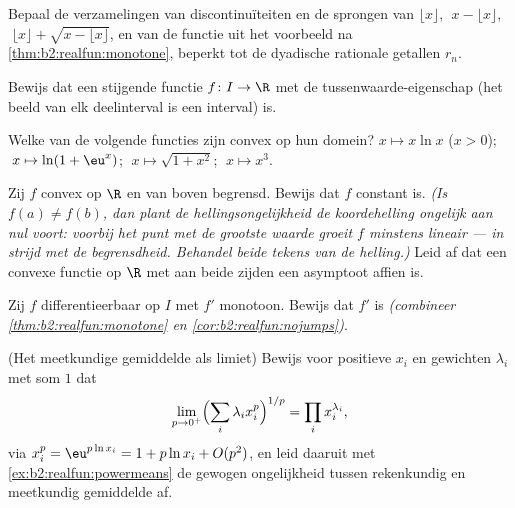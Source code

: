 \begin{exercise}[$\star$]\label{exo:b2:realfun:1}
Bepaal de verzamelingen van discontinuïteiten en de sprongen van
$\lfloor x \rfloor$, $\;x - \lfloor x\rfloor$, $\;\lfloor x \rfloor
+ \sqrt{x - \lfloor x\rfloor}$, en van de functie uit het voorbeeld
na \cref{thm:b2:realfun:monotone}, beperkt tot de dyadische
rationale getallen $r_n$.
\end{exercise}

\begin{exercise}[$\star$]\label{exo:b2:realfun:2}
Bewijs dat een stijgende functie $f \colon I \to \R$ met de
tussenwaarde-eigenschap (het beeld van elk deelinterval is een
interval)  is.
\end{exercise}

\begin{exercise}[$\star$]\label{exo:b2:realfun:3}
Welke van de volgende functies zijn convex op hun domein? $x
\mapsto x\ln x$ ($x > 0$); $\;x \mapsto \ln(1 + \eu^x)$; $\;x
\mapsto \sqrt{1 + x^2}$; $\;x \mapsto x^3$.
\end{exercise}

\begin{exercise}[$\star\star$]\label{exo:b2:realfun:4}
Zij $f$ convex op $\R$ en van boven begrensd. Bewijs dat $f$
constant is. \emph{(Is $f(a) \neq f(b)$, dan plant de
hellingsongelijkheid de koordehelling ongelijk aan nul voort:
voorbij het punt met de grootste waarde groeit $f$ minstens lineair
--- in strijd met de begrensdheid. Behandel beide tekens van de
helling.)} Leid af dat een convexe functie op $\R$ met aan beide
zijden een asymptoot affien is.
\end{exercise}

\begin{exercise}[$\star\star$]\label{exo:b2:realfun:5}
Zij $f$ differentieerbaar op $I$ met $f'$ monotoon. Bewijs dat $f'$
 is \emph{(combineer \cref{thm:b2:realfun:monotone} en
\cref{cor:b2:realfun:nojumps})}.
\end{exercise}

\begin{exercise}[$\star\star$]\label{exo:b2:realfun:6}
(Het meetkundige gemiddelde als limiet) Bewijs voor positieve $x_i$
en gewichten $\lambda_i$ met som $1$ dat
\[
\lim_{p \to 0^+} \Bigl(\sum_i \lambda_i x_i^p\Bigr)^{1/p}
= \prod_i x_i^{\lambda_i} ,
\]
via $x_i^p = \eu^{p\ln x_i} = 1 + p\ln x_i + O(p^2)$, en leid
daaruit met \cref{ex:b2:realfun:powermeans} de gewogen
ongelijkheid tussen rekenkundig en meetkundig gemiddelde af.
\end{exercise}

